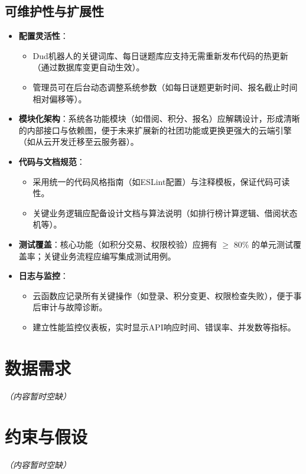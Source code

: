 \documentclass[a4paper,12pt]{article}
\begin{document}
\subsection{可维护性与扩展性}
\begin{itemize}
    \item \textbf{配置灵活性}：
        \begin{itemize}
            \item Dud机器人的关键词库、每日谜题库应支持无需重新发布代码的热更新（通过数据库变更自动生效）。
            \item 管理员可在后台动态调整系统参数（如每日谜题更新时间、报名截止时间相对偏移等）。
        \end{itemize}
    \item \textbf{模块化架构}：系统各功能模块（如借阅、积分、报名）应解耦设计，形成清晰的内部接口与依赖图，便于未来扩展新的社团功能或更换更强大的云端引擎（如从云开发迁移至云服务器）。
    \item \textbf{代码与文档规范}：
        \begin{itemize}
            \item 采用统一的代码风格指南（如ESLint配置）与注释模板，保证代码可读性。
            \item 关键业务逻辑应配备设计文档与算法说明（如排行榜计算逻辑、借阅状态机等）。
        \end{itemize}
    \item \textbf{测试覆盖}：核心功能（如积分交易、权限校验）应拥有 $\geq$ 80\% 的单元测试覆盖率；关键业务流程应编写集成测试用例。
    \item \textbf{日志与监控}：
        \begin{itemize}
            \item 云函数应记录所有关键操作（如登录、积分变更、权限检查失败），便于事后审计与故障诊断。
            \item 建立性能监控仪表板，实时显示API响应时间、错误率、并发数等指标。
        \end{itemize}
\end{itemize}

\section{数据需求}
\textit{（内容暂时空缺）}

\section{约束与假设}
\textit{（内容暂时空缺）}
\end{document}
